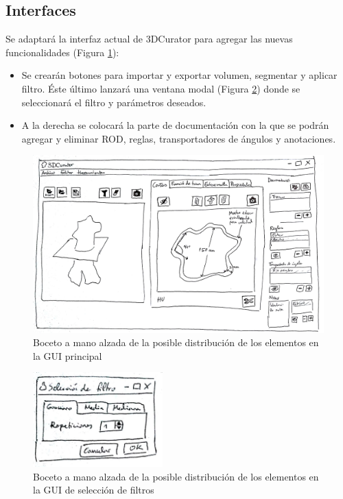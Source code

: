 \subsection{Interfaces}

Se adaptará la interfaz actual de 3DCurator para agregar las nuevas funcionalidades (Figura \ref{fig:requisitos/boceto-gui-ppal}):

\begin{itemize}
	\item Se crearán botones para importar y exportar volumen, segmentar y aplicar filtro. Éste último lanzará una ventana modal (Figura \ref{fig:requisitos/boceto-gui-filtro}) donde se seleccionará el filtro y parámetros deseados.
	\item A la derecha se colocará la parte de documentación con la que se podrán agregar y eliminar ROD, reglas, transportadores de ángulos y anotaciones.
\end{itemize}

\begin{figure}[H]
	\centering
	\includegraphics[width=12cm]{imagenes/requisitos/boceto-gui-ppal}
	\caption{Boceto a mano alzada de la posible distribución de los elementos en la GUI principal}
	\label{fig:requisitos/boceto-gui-ppal}
\end{figure}

\begin{figure}[H]
	\centering
	\includegraphics[width=5cm]{imagenes/requisitos/boceto-gui-filtro}
	\caption{Boceto a mano alzada de la posible distribución de los elementos en la GUI de selección de filtros}
	\label{fig:requisitos/boceto-gui-filtro}
\end{figure}

